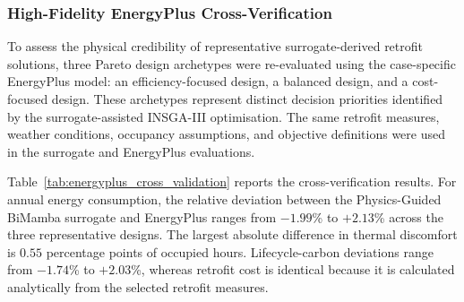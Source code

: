\documentclass[11pt]{article}
\begin{document}
\subsubsection{High-Fidelity EnergyPlus Cross-Verification}
\label{sec:energyplus_cross_validation}

To assess the physical credibility of representative surrogate-derived retrofit solutions, three Pareto design archetypes were re-evaluated using the case-specific EnergyPlus model: an efficiency-focused design, a balanced design, and a cost-focused design. These archetypes represent distinct decision priorities identified by the surrogate-assisted INSGA-III optimisation. The same retrofit measures, weather conditions, occupancy assumptions, and objective definitions were used in the surrogate and EnergyPlus evaluations.


Table~\ref{tab:energyplus_cross_validation} reports the cross-verification results. For annual energy consumption, the relative deviation between the Physics-Guided BiMamba surrogate and EnergyPlus ranges from $-1.99$\% to $+2.13$\% across the three representative designs. The largest absolute difference in thermal discomfort is $0.55$ percentage points of occupied hours. Lifecycle-carbon deviations range from $-1.74$\% to $+2.03$\%, whereas retrofit cost is identical because it is calculated analytically from the selected retrofit measures.
\end{document}
